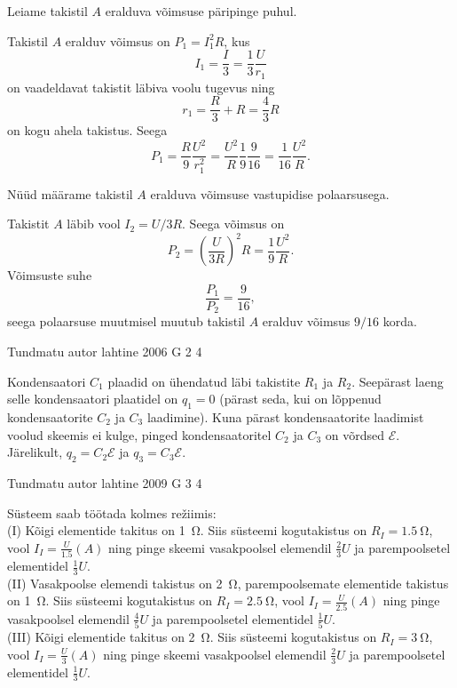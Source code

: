 \documentclass[11pt, twoside]{article}
\begin{document}
{{Leiame takistil $A$ eralduva võimsuse päripinge puhul. 

Takistil $A$ eralduv võimsus on $P_1 = I_1^2R$, kus
\[
I_1 = \frac{I}{3} = \frac{1}{3} \frac{U}{r_1}
\]
on vaadeldavat takistit läbiva voolu tugevus ning
\[
r_1 = \frac{R}{3} + R = \frac{4}{3} R
\]
on kogu ahela takistus. Seega
\[
P_1=\frac{R}{9} \frac{U^{2}}{r_{1}^{2}}=\frac{U^{2}}{R} \frac{1}{9} \frac{9}{16}=\frac{1}{16} \frac{U^{2}}{R}.
\]

Nüüd määrame takistil $A$ eralduva võimsuse vastupidise polaarsusega. 

Takistit $A$ läbib vool $I_2 = U/3R$. Seega võimsus on
\[
P_{2}=\left(\frac{U}{3 R}\right)^{2} R=\frac{1}{9} \frac{U^{2}}{R}.
\]
Võimsuste suhe
\[
\frac{P_1}{P_2} = \frac{9}{16},
\]
seega polaarsuse muutmisel muutub takistil $A$ eralduv võimsus $9/16$ korda.
\fi
}

{Tundmatu autor} %
{lahtine} %
{2006} %
{G 2} %
{4} %
{

\ifSolution
Kondensaatori $C_1$ plaadid on ühendatud läbi takistite $R_1$ ja $R_2$. Seepärast laeng selle kondensaatori plaatidel on $q_1 = 0$ (pärast seda, kui on lõppenud kondensaatorite $C_2$ ja $C_3$ laadimine). Kuna pärast kondensaatorite laadimist voolud skeemis ei kulge, pinged kondensaatoritel $C_2$ ja $C_3$ on võrdsed $\mathcal E$. Järelikult, $q_2 = C_2\mathcal E$ ja $q_3 = C_3\mathcal E$. 
\fi
}

{Tundmatu autor} %
{lahtine} %
{2009} %
{G 3} %
{4} %
{

\ifSolution
Süsteem saab töötada kolmes režiimis:\\
(I) Kõigi elementide takitus on \SI{1}{\ohm}. Siis süsteemi kogutakistus on $R_I = \SI{1,5}{\ohm}$, vool $I_I = \frac{U}{\num{1,5}}(\si{A})$ ning pinge skeemi vasakpoolsel elemendil $\frac{2}{3}U$ ja parempoolsetel elementidel $\frac 13U$.\\
(II) Vasakpoolse elemendi takistus on \SI{2}{\ohm}, parempoolsemate elementide takistus on \SI{1}{\ohm}. Siis süsteemi kogutakistus on $R_I = \SI{2,5}{\ohm}$, vool $I_I = \frac{U}{\num{2,5}}(\si{A})$ ning pinge vasakpoolsel elemendil $\frac 45U$ ja parempoolsetel elementidel $\frac 15U$.\\
(III) Kõigi elementide takitus on \SI{2}{\ohm}. Siis süsteemi kogutakistus on $R_I = \SI{3}{\ohm}$, vool $I_I = \frac U3(A)$ ning pinge skeemi vasakpoolsel elemendil $\frac 23U$ ja parempoolsetel elementidel $\frac 13U$.

}}
\end{document}
